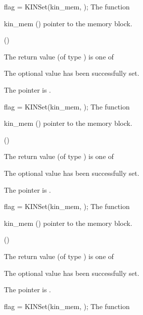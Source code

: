{}
{
flag = KINSet(kin\_mem, );
}
{
  The function 
}
{
  \begin{args}
  \item[kin\_mem] ()
    pointer to the {\kinsol} memory block.
  \item[] (\id{})

  \end{args}
}
{
  The return value  (of type ) is one of
  \begin{args}
  \item[\Id{KIN\_SUCCESS}] 
    The optional value has been successfully set.
  \item[\Id{KIN\_MEM\_NULL}]
    The  pointer is .
  \end{args}
}
{}
{
flag = KINSet(kin\_mem, );
}
{
  The function 
}
{
  \begin{args}
  \item[kin\_mem] ()
    pointer to the {\kinsol} memory block.
  \item[] (\id{})

  \end{args}
}
{
  The return value  (of type ) is one of
  \begin{args}
  \item[\Id{KIN\_SUCCESS}] 
    The optional value has been successfully set.
  \item[\Id{KIN\_MEM\_NULL}]
    The  pointer is .
  \end{args}
}
{}
{
flag = KINSet(kin\_mem, );
}
{
  The function 
}
{
  \begin{args}
  \item[kin\_mem] ()
    pointer to the {\kinsol} memory block.
  \item[] (\id{})

  \end{args}
}
{
  The return value  (of type ) is one of
  \begin{args}
  \item[\Id{KIN\_SUCCESS}] 
    The optional value has been successfully set.
  \item[\Id{KIN\_MEM\_NULL}]
    The  pointer is .
  \end{args}
}
{}
{
flag = KINSet(kin\_mem, );
}
{
  The function 
}
